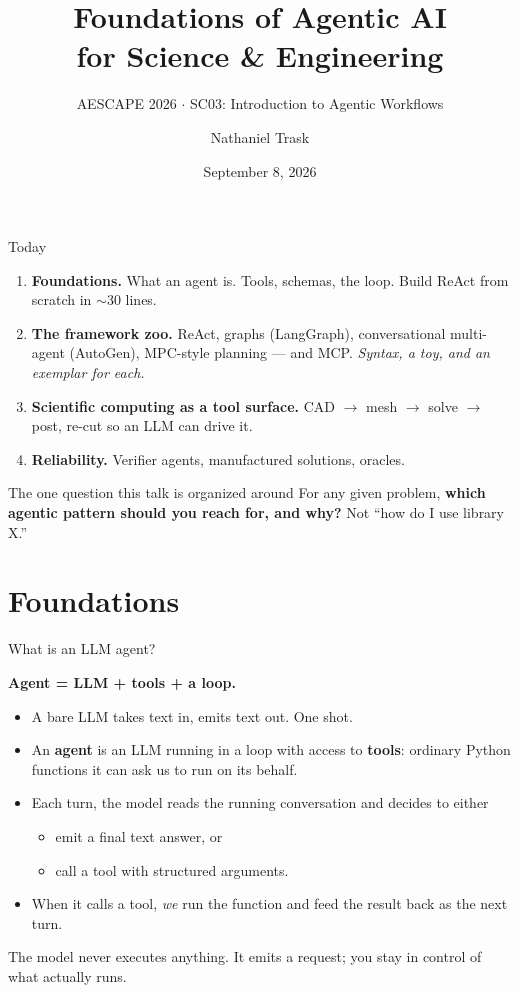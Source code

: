 \documentclass[aspectratio=169,10pt]{beamer}
\title{\Large Foundations of Agentic AI\\for Science \& Engineering}
\subtitle{AESCAPE 2026 $\cdot$ SC03: Introduction to Agentic Workflows}
\author{Nathaniel Trask}
\institute{\small University of Pennsylvania}
\date{September 8, 2026}
\newcommand{\hl}[1]{\textcolor{accent}{\textbf{#1}}}
\begin{document}
\begin{frame}[plain]
  \titlepage
\end{frame}

\begin{frame}{Today}
\begin{enumerate}\itemsep8pt
  \item \textbf{Foundations.} What an agent is. Tools, schemas, the loop.
        Build ReAct from scratch in ${\sim}30$ lines.
  \item \textbf{The framework zoo.} ReAct, graphs (LangGraph), conversational
        multi-agent (AutoGen), MPC-style planning --- and MCP.
        \emph{Syntax, a toy, and an exemplar for each.}
  \item \textbf{Scientific computing as a tool surface.} CAD $\to$ mesh $\to$
        solve $\to$ post, re-cut so an LLM can drive it.
  \item \textbf{Reliability.} Verifier agents, manufactured solutions, oracles.
\end{enumerate}

\vfill
\begin{block}{The one question this talk is organized around}
For any given problem, \hl{which agentic pattern should you reach for, and why?}
Not ``how do I use library X.''
\end{block}
\end{frame}

\section{Foundations}

\begin{frame}{What is an LLM agent?}
\begin{center}\large
\textbf{Agent = LLM + tools + a loop.}
\end{center}
\vspace{1em}
\begin{itemize}\itemsep6pt
  \item A bare LLM takes text in, emits text out. One shot.
  \item An \hl{agent} is an LLM running in a loop with access to \hl{tools}:
        ordinary Python functions it can ask us to run on its behalf.
  \item Each turn, the model reads the running conversation and decides to either
  \begin{itemize}
    \item emit a final text answer, or
    \item call a tool with structured arguments.
  \end{itemize}
  \item When it calls a tool, \emph{we} run the function and feed the result back
        as the next turn.
\end{itemize}
\vfill
The model never executes anything. It emits a request; you stay in control of
what actually runs.
\end{frame}
\end{document}
